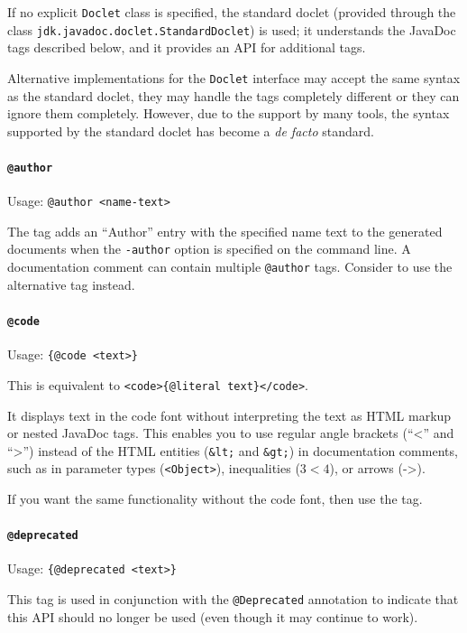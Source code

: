 \documentclass[11pt,a4paper, titlepage, parskip=half, headsepline, footsepline, cleardoublepage=current, headheight=1cm]{scrbook}
\begin{document}
If no explicit \lstinline|Doclet| class is specified, the standard doclet (provided through the class \lstinline|jdk.javadoc.doclet.StandardDoclet|\autocite{ORACLE_DOC_STANDARDDOCLET_CLASS}) is used; it understands the JavaDoc tags described below, and it provides an API for additional tags.

Alternative implementations for the \lstinline|Doclet| interface may accept the same syntax as the standard doclet, they may handle the tags completely different or they can ignore them completely. However, due to the support by many tools, the syntax supported by the standard doclet has become a \textit{de facto} standard.

\paragraph{\lstinline|@author|}\label{sec:TagAuthor} Usage: \lstinline|@author <name-text>|

The tag adds an “Author” entry with the specified name text to the generated documents when the \verb#-author# option is specified on the command line. A documentation comment can contain multiple \lstinline|@author| tags. Consider to use the alternative  tag instead.

\paragraph{\lstinline|@code|}\label{sec:TagCode}  Usage: \lstinline|{@code <text>}|

This is equivalent to \lstinline|<code>{@literal text}</code>|.

It displays text in the code font without interpreting the text as HTML markup or nested JavaDoc tags. This enables you to use regular angle brackets (“\textless” and “\textgreater”) instead of the HTML entities (\verb#&lt;# and \verb#&gt;#) in documentation comments, such as in parameter types (\verb#<Object>#), inequalities ($3 < 4$), or arrows (-\textgreater).

If you want the same functionality without the code font, then use the  tag. 

\paragraph{\lstinline|@deprecated|}  Usage: \lstinline|{@deprecated <text>}|

This tag is used in conjunction with the \lstinline|@Deprecated|\autocite{ORACLE_DOC_DEPRECATED_ANNOTATION} annotation to indicate that this API should no longer be used (even though it may continue to work).
\end{document}
